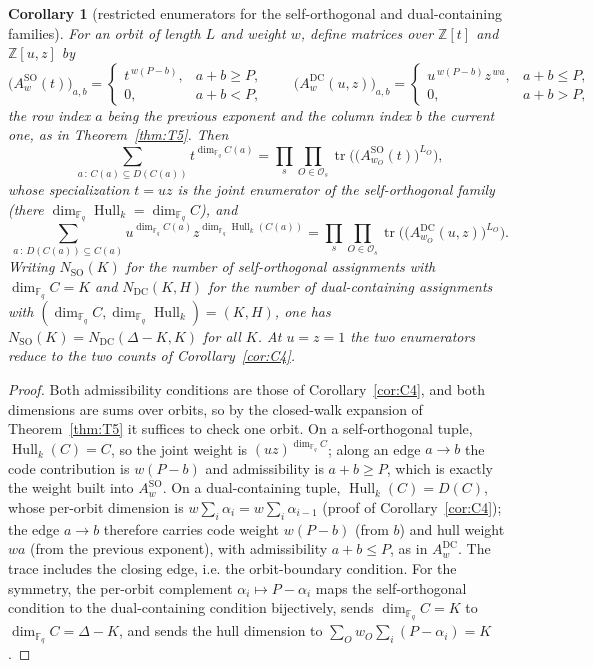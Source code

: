 \documentclass[10pt,journal,draftclsnofoot,onecolumn]{IEEEtran}
\newtheorem{corollary}[theorem]{Corollary}
\theoremstyle{definition}
\theoremstyle{remark}
\newcommand{\Fq}{\mathbb{F}_q}
\newcommand{\Z}{\mathbb{Z}}
\newcommand{\Hull}{\operatorname{Hull}}
\newcommand{\tr}{\operatorname{tr}}
\begin{document}
\begin{corollary}[restricted enumerators for the self-orthogonal and
dual-containing families]\label{cor:restricted}
For an orbit of length \(L\) and weight \(w\), define matrices over
\(\Z[t]\) and \(\Z[u,z]\) by
\[
\big(A^{\mathrm{SO}}_w(t)\big)_{a,b} =
\begin{cases} t^{\,w(P-b)}, & a + b \ge P, \\ 0, & a + b < P,
\end{cases}
\qquad
\big(A^{\mathrm{DC}}_w(u,z)\big)_{a,b} =
\begin{cases} u^{\,w(P-b)} z^{\,wa}, & a + b \le P, \\ 0, & a + b > P,
\end{cases}
\]
the row index \(a\) being the previous exponent and the column index
\(b\) the current one, as in Theorem~\ref{thm:T5}. Then
\[
\sum_{a \,:\, C(a) \subseteq D(C(a))} t^{\dim_{\Fq} C(a)}
= \prod_{s} \prod_{O \in \mathcal{O}_s}
\tr\!\Big(\big(A^{\mathrm{SO}}_{w_O}(t)\big)^{L_O}\Big),
\]
whose specialization \(t = uz\) is the joint enumerator of the
self-orthogonal family (there \(\dim_{\Fq} \Hull_k = \dim_{\Fq} C\)), and
\[
\sum_{a \,:\, D(C(a)) \subseteq C(a)}
u^{\dim_{\Fq} C(a)} z^{\dim_{\Fq} \Hull_k(C(a))}
= \prod_{s} \prod_{O \in \mathcal{O}_s}
\tr\!\Big(\big(A^{\mathrm{DC}}_{w_O}(u,z)\big)^{L_O}\Big).
\]
Writing \(N_{\mathrm{SO}}(K)\) for the number of self-orthogonal
assignments with \(\dim_{\Fq} C = K\) and \(N_{\mathrm{DC}}(K,H)\) for
the number of dual-containing assignments with
\((\dim_{\Fq} C, \dim_{\Fq} \Hull_k) = (K,H)\), one has
\(N_{\mathrm{SO}}(K) = N_{\mathrm{DC}}(\Delta - K, K)\) for all \(K\).
At \(u = z = 1\) the two enumerators reduce to the two counts of
Corollary~\ref{cor:C4}.
\end{corollary}

\begin{proof}
Both admissibility conditions are those of Corollary~\ref{cor:C4}, and
both dimensions are sums over orbits, so by the closed-walk expansion of
Theorem~\ref{thm:T5} it suffices to check one orbit. On a
self-orthogonal tuple, \(\Hull_k(C) = C\), so the joint weight is
\((uz)^{\dim_{\Fq} C}\); along an edge \(a \to b\) the code contribution
is \(w(P-b)\) and admissibility is \(a+b \ge P\), which is exactly the
weight built into \(A^{\mathrm{SO}}_w\). On a dual-containing tuple,
\(\Hull_k(C) = D(C)\), whose per-orbit dimension is
\(w \sum_i \alpha_i = w \sum_i \alpha_{i-1}\) (proof of
Corollary~\ref{cor:C4}); the edge \(a \to b\) therefore carries code
weight \(w(P-b)\) (from \(b\)) and hull weight \(wa\) (from the previous
exponent), with admissibility \(a + b \le P\), as in
\(A^{\mathrm{DC}}_w\). The trace includes the closing edge, i.e. the
orbit-boundary condition. For the symmetry, the per-orbit complement
\(\alpha_i \mapsto P - \alpha_i\) maps the self-orthogonal condition to
the dual-containing condition bijectively, sends \(\dim_{\Fq} C = K\) to
\(\dim_{\Fq} C = \Delta - K\), and sends the hull dimension to
\(\sum_O w_O \sum_i (P - \alpha_i) = K\).
\end{proof}
\end{document}
